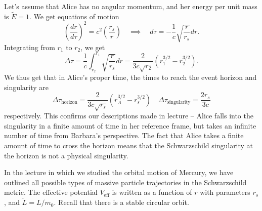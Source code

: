 \documentclass{../../templates/lkx_pset}
\begin{document}
\begin{parts}
  Let's assume that Alice has no angular momentum, and her energy per unit mass is $\widetilde{E}=1$. We get equations of motion
  \[
    \left(\frac{dr}{d\tau}\right)^2 = c^2\left(\frac{r_s}{r}\right) \quad\implies\quad d\tau = -\frac{1}{c}\sqrt{\frac{r}{r_s}}dr.
  \]
  Integrating from $r_1$ to $r_2$, we get
  \[
    \Delta \tau = \frac{1}{c}\int_{r_2}^{r_1} \sqrt{\frac{r}{r_s}}dr = \frac{2}{3c\sqrt{r_2}}\left(r_1^{3/2} - r_2^{3/2}\right).
  \]
  We thus get that in Alice's proper time, the times to reach the event horizon and singularity are
  \[
    \Delta \tau_{\textrm{horizon}} = \frac{2}{3c\sqrt{r_s}}\left(r_A^{3/2} - r_s^{3/2}\right)\quad\Delta \tau_{\textrm{singularity}} = \frac{2r_s}{3c}
  \]
  respectively. This confirms our descriptions made in lecture -- Alice falls into the singularity in a finite amount of time in her reference frame, but takes an infinite number of time from Barbara's perspective. The fact that Alice takes a finite amount of time to cross the horizon means that the Schwarzschild singularity at the horizon is not a physical singularity.
\end{parts}

\begin{problem}{2}
In the lecture in which we studied the orbital motion of Mercury, we have outlined all possible types of massive particle trajectories in the Schwarzschild metric. The effective potential $V_{\textrm{eff}}$ is written as a function of $r$ with parameters $r_s$, and $\widetilde{L}=L/m_0$. Recall that there is a stable circular orbit.
\end{problem}
\end{document}
